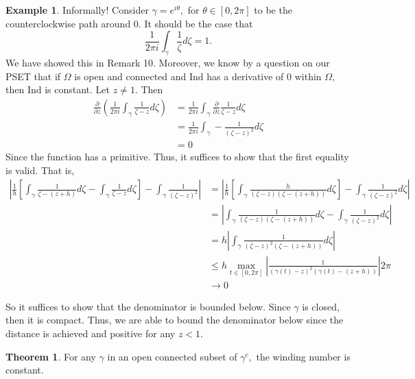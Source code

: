 \documentclass[10pt, oneside]{article}
\newcommand{\Ind}{\text{Ind}}
\theoremstyle{definition}
\newtheorem{exmp}{Example}[section]
\newtheorem{thm}{Theorem}
\begin{document}
\begin{exmp}
    Informally! Consider $\gamma = e^{i\theta},$ for $\theta \in [0,2\pi]$ to be the counterclockwise path around $0.$ It should be the case that  
    \[\frac{1}{2\pi i } \int_\gamma \frac{1}{\zeta}d\zeta = 1.\] We have showed this in Remark 10. Moreover, we know by a question on our PSET that if $\Omega$ is open and connected and $\Ind$ has a derivative of $0$ within $\Omega,$ then $\Ind$ is constant. Let $z \neq 1.$ Then 
    \begin{align*}
        \frac{\partial}{\partial z}\left(\frac{1}{2\pi i }\int_\gamma \frac{1}{\zeta - z}d\zeta\right)
        &= \frac{1}{2\pi i}\int_{\gamma} \frac{\partial}{\partial z} \frac{1}{\zeta - z}d\zeta\\
        &= \frac{1}{2\pi i} \int_\gamma -\frac{1}{(\zeta - z)^2}d\zeta\\
        &= 0
    \end{align*}
    Since the function has a primitive. Thus, it suffices to show that the first equality is valid. That is, 
    \begin{align*}
        \left|\frac{1}{h}\left[\int_\gamma \frac{1}{\zeta - (z + h)}d\zeta - \int_\gamma \frac{1}{\zeta - z}d\zeta\right] - \int_\gamma \frac{1}{(\zeta - z)^2}\right|
        &= 
        \left|\frac{1}{h}\left[\int_\gamma \frac{h}{(\zeta - z)(\zeta - (z + h))}d\zeta\right] - \int_\gamma \frac{1}{(\zeta - z)^2}d\zeta\right|\\
        &= \left|\int_\gamma \frac{1}{(\zeta - z)(\zeta - (z + h))}d\zeta - \int_\gamma \frac{1}{(\zeta - z)^2}d\zeta\right|\\
        &= h\left|\int_\gamma \frac{1}{(\zeta - z)^2(\zeta - (z + h))}d\zeta\right|\\
        &\leq h \max_{t\in [0,2\pi]} |\frac{1}{(\gamma(t) - z)^2(\gamma(t) - (z + h))}| 2\pi\\
        &\to 0
    \end{align*}
\end{exmp}
So it suffices to show that the denominator is bounded below. Since $\gamma$ is closed, then it is compact. Thus, we are able to bound the denominator below since the distance is achieved and positive for any $z < 1.$

\begin{thm}
    For any $\gamma$ in an open connected subset of $\gamma^c,$ the winding number is constant. 
\end{thm}


\newpage
\end{document}
